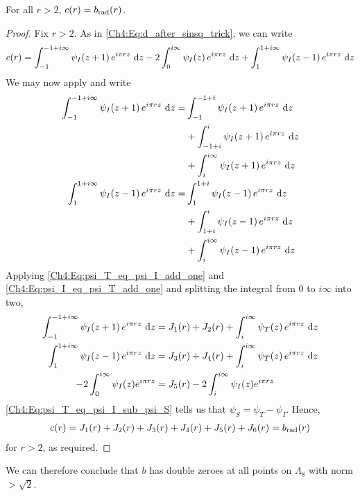 \begin{boxproposition}\label{Ch4:Prop:b_eq_c}
    For all $r > 2$, $c(r) = b_{\operatorname{rad}}(r)$.
\end{boxproposition}
\begin{proof}
    Fix $r > 2$. As in \eqref{Ch4:Eq:d_after_sinsq_trick}, we can write
    \begin{align*}
        c(r)
        = \int_{-1}^{-1 + i\infty} \psi_I\!\left( z + 1 \right) e^{i\pi r z} \, \operatorname{d}\!{z}
        - 2 \int_{0}^{i\infty} \psi_I\!\left( z \right) e^{i\pi r z} \, \operatorname{d}\!{z}
        + \int_{1}^{1 + i\infty} \psi_I\!\left( z - 1 \right) e^{i\pi r z} \, \operatorname{d}\!{z}
    \end{align*}
    We may now apply  and write
    \begin{align*}
        \int_{-1}^{-1 + i\infty} \psi_I\of{z + 1} e^{i\pi r z} \, \diff{z}
        =& \int_{-1}^{-1 + i} \psi_I\of{z + 1} e^{i\pi r z} \, \diff{z} \\
        &+ \int_{-1 + i}^{i} \psi_I\of{z + 1} e^{i\pi r z} \, \diff{z} \\
        &+ \int_{i}^{i\infty} \psi_I\of{z + 1} e^{i\pi r z} \, \diff{z} \\
        \int_{1}^{1 + i\infty} \psi_I\of{z - 1} e^{i\pi r z} \, \diff{z}
        =& \int_{1}^{1 + i}\psi_I\of{z - 1} e^{i\pi r z} \, \diff{z} \\
        &+ \int_{1 + i}^{i} \psi_I\of{z - 1} e^{i\pi r z} \, \diff{z} \\
        &+ \int_{i}^{i\infty}\psi_I\of{z - 1} e^{i\pi r z} \, \diff{z}
    \end{align*}
    Applying \eqref{Ch4:Eq:psi_T_eq_psi_I_add_one} and \eqref{Ch4:Eq:psi_I_eq_psi_T_add_one} and splitting the integral from $0$ to $i\infty$ into two,
    \begin{align*}
        \int_{-1}^{-1 + i\infty} \psi_I\of{z + 1} e^{i\pi r z} \, \diff{z}
        &= J_1(r) + J_2(r) + \int_{i}^{i\infty} \psi_T\of{z} e^{i\pi r z} \, \diff{z} \\
        \int_{1}^{1 + i\infty} \psi_I\of{z - 1} e^{i\pi r z} \, \diff{z}
        &= J_3(r) + J_4(r) + \int_{i}^{i\infty} \psi_T\of{z} e^{i\pi r z} \, \diff{z} \\
        -2\int_{0}^{i\infty} \psi_I(z) e^{i \pi r z} &= J_5(r) - 2\int_{i}^{i\infty} \psi_I(z) e^{i \pi r z}
    \end{align*}
    \eqref{Ch4:Eq:psi_T_eq_psi_I_sub_psi_S} tells us that $\psi_S = \psi_T - \psi_I$. Hence,
    \begin{align*}
        c(r) = J_1(r) + J_2(r) + J_3(r) + J_4(r) + J_5(r) + J_6(r) = b_{\operatorname{rad}}(r)
    \end{align*}
    for $r > 2$, as required.
\end{proof}

We can therefore conclude that $b$ has double zeroes at all points on $\Lambda_8$ with norm $> \sqrt{2}$.